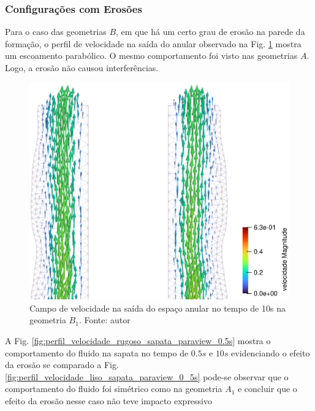 \subsubsection{Configurações com Erosões}
    
Para o caso das geometrias $B$, em que há um certo grau de erosão na parede da formação, o perfil de velocidade na saída do anular observado na Fig. \ref{fig:perfil_velocidade_rugoso_saida_paraview_10s} mostra um escoamento parabólico. O mesmo comportamento foi visto nas geometrias $A$. Logo, a erosão não causou interferências.
\begin{figure}[H]
        \centering
    	\includegraphics[scale=0.5]{img/perfil_vel/rugoso/perfil_de_vel_saida_paraview.eps}
    	\caption{Campo de velocidade na saída do espaço anular no tempo de 10s na geometria $B_1$. Fonte: autor}
    	\label{fig:perfil_velocidade_rugoso_saida_paraview_10s}
\end{figure}
    
A Fig. \ref{fig:perfil_velocidade_rugoso_sapata_paraview_0.5s} mostra o comportamento do fluido na sapata no tempo de $0.5s$ e $10s$ evidenciando o efeito da erosão se comparado a Fig. \ref{fig:perfil_velocidade_liso_sapata_paraview_0_5s} pode-se observar que o comportamento do fluido foi simétrico como na geometria $A_1$ e concluir que o efeito da erosão nesse caso não teve impacto expressivo
    
